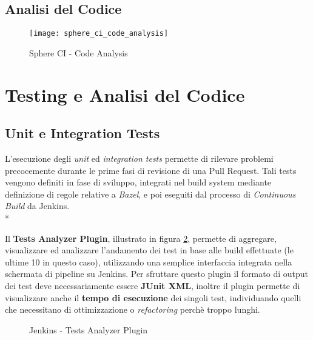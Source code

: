 \documentclass[../main.tex]{subfiles}
\begin{document}
    	    \subsection{Analisi del Codice}
    	    
    	        \begin{figure}[H]
        			\centering
        			\texttt{[image: sphere\_ci\_code\_analysis]}
        			\caption{Sphere CI - Code Analysis}
        			\label{fig:sphere_ci_code_analysis}
    	        \end{figure}
    	
    	\section{Testing e Analisi del Codice}
    	
    	    \subsection{Unit e Integration Tests}
    	    
    	        L'esecuzione degli \emph{unit} ed \emph{integration tests} permette di rilevare problemi precocemente durante le prime fasi di revisione di una Pull Request. Tali tests vengono definiti in fase di sviluppo, integrati nel build system mediante definizione di regole relative a \emph{Bazel}, e poi eseguiti dal processo di \emph{Continuous Build} da Jenkins.\\*
    	        
    	        Il \textbf{Tests Analyzer Plugin}, illustrato in figura \ref{fig:jenkins_test_analyzer}, permette di aggregare, visualizzare ed analizzare l'andamento dei test in base alle build effettuate (le ultime 10 in questo caso), utilizzando una semplice interfaccia integrata nella schermata di pipeline su Jenkins. Per sfruttare questo plugin il formato di output dei test deve necessariamente essere \textbf{JUnit XML}, inoltre il plugin permette di visualizzare anche il \textbf{tempo di esecuzione} dei singoli test, individuando quelli che necessitano di ottimizzazione o \emph{refactoring} perchè troppo lunghi.
    	
    	        \begin{figure}[H]
        			\centering
        			\caption{Jenkins - Tests Analyzer Plugin}
        			\label{fig:jenkins_test_analyzer}
    	        \end{figure}
    	
\end{document}
